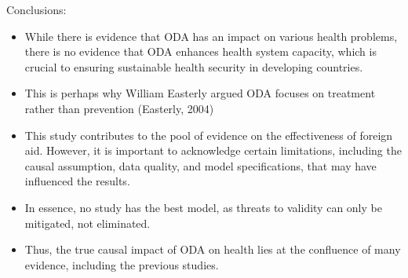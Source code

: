 \documentclass[aspectratio=169,handout, 10pt]{beamer}
\begin{document}
\begin{frame}{Conclusions:}

\begin{itemize}
    \item While there is evidence that ODA has an impact on various health problems, there is no evidence that ODA enhances health system capacity, which is crucial to ensuring sustainable health security in developing countries.
    \item This is perhaps why William Easterly argued ODA focuses on treatment rather than prevention (Easterly, 2004)
    \item This study contributes to the pool of evidence on the effectiveness of foreign aid. However, it is important to acknowledge certain limitations, including the causal assumption, data quality, and model specifications, that may have influenced the results.
    \item In essence, no study has the best model, as threats to validity can only be mitigated, not eliminated. 
    \item Thus, the true causal impact of ODA on health lies at the confluence of many evidence, including the previous studies. 
 
\end{itemize}    
\end{frame}
\end{document}
